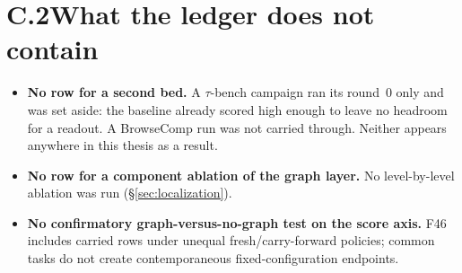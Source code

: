 \section*{C.2\quad What the ledger does not contain}

\begin{itemize}
  \item \textbf{No row for a second bed.} A $\tau$-bench campaign ran its
        round~0 only and was set aside: the baseline already scored high
        enough to leave no headroom for a readout. A BrowseComp run was not
        carried through. Neither appears anywhere in this thesis as a result.
  \item \textbf{No row for a component ablation of the graph layer.} No
        level-by-level ablation was run (\S\ref{sec:localization}).
  \item \textbf{No confirmatory graph-versus-no-graph test on the score axis.}
        F46 includes carried rows under unequal fresh/carry-forward policies;
        common tasks do not create contemporaneous fixed-configuration endpoints.
\end{itemize}
